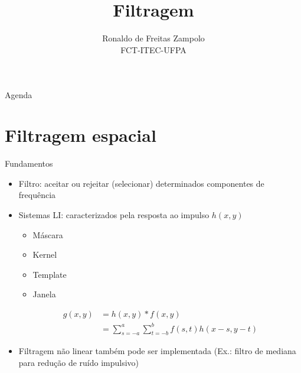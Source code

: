 


\title{\cursogrande\\ \vspace{1cm}Filtragem}
\author{Ronaldo de Freitas Zampolo\\FCT-ITEC-UFPA}


   \maketitle[randomdots={false}]
   \begin{slide}{Agenda}
      \tableofcontents[content=sections]
   \end{slide}

\section[ slide = true]{Filtragem espacial}
   \begin{slide}[toc=]{Fundamentos}
      \begin{itemize}
       \item Filtro: aceitar ou rejeitar (selecionar) determinados componentes de frequência
       \item Sistemas LI: caracterizados pela resposta ao impulso $h(x,y)$
       \begin{itemize}
          \item Máscara
          \item Kernel
          \item Template
          \item Janela
       \end{itemize}
       \begin{align*}
          g(x,y) &= h(x,y)\ast f(x,y)\\
                 &= \sum_{s=-a}^{a}\sum_{t= -b}^{b} f(s,t)h(x-s,y-t) 
       \end{align*}
       \item Filtragem não linear também pode ser implementada (Ex.: filtro de mediana para redução de ruído impulsivo)
      \end{itemize}
   \end{slide}


